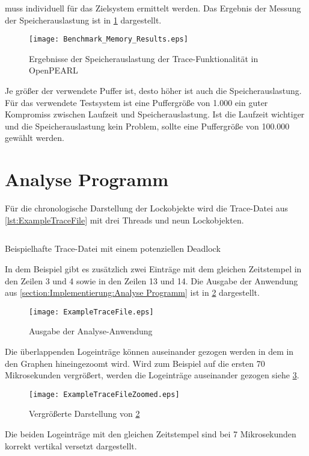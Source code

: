muss individuell für das Zielsystem ermittelt werden. Das Ergebnis der Messung
der Speicherauslastung ist in \cref{fig:BenchmarkMemoryResults} dargestellt.
\begin{figure}[ht]
  \texttt{[image: Benchmark\_Memory\_Results.eps]}
  \caption{Ergebnisse der Speicherauslastung der Trace-Funktionalität in OpenPEARL}
  \label{fig:BenchmarkMemoryResults}
\end{figure}
Je größer der verwendete Puffer ist, desto höher ist auch die
Speicherauslastung. Für das verwendete Testsystem ist eine Puffergröße von 1.000
ein guter Kompromiss zwischen Laufzeit und Speicherauslastung. Ist die Laufzeit
wichtiger und die Speicherauslastung kein Problem, sollte eine Puffergröße von
100.000 gewählt werden.

\section{Analyse Programm}
\label{section:ValidierungAnalyseProgramm}
Für die chronologische Darstellung der Lockobjekte wird die Trace-Datei aus
\cref{lst:ExampleTraceFile} mit drei Threads und neun Lockobjekten.
\begin{listing}[ht]
  \begin{minipage}[ht]{\linewidth}
    \begin{multicols}{3}
      \inputminted[linenos]{text}{./Examples/ExampleTraceFile.log}
    \end{multicols}
    \caption{Beispielhafte Trace-Datei mit einem potenziellen Deadlock}
    \label{lst:ExampleTraceFile}
  \end{minipage}
\end{listing}
In dem Beispiel gibt es zusätzlich zwei Einträge mit dem gleichen Zeitstempel in
den Zeilen 3 und 4 sowie in den Zeilen 13 und 14. Die Ausgabe der Anwendung aus
\cref{section:Implementierung:Analyse Programm} ist in
\cref{fig:LockTraceVisualization} dargestellt.
\begin{figure}[ht]
  \texttt{[image: ExampleTraceFile.eps]}
  \caption{Ausgabe der Analyse-Anwendung}
  \label{fig:LockTraceVisualization}
\end{figure}
Die überlappenden Logeinträge können auseinander gezogen werden in dem in den
Graphen hineingezoomt wird. Wird zum Beispiel auf die ersten 70 Mikrosekunden
vergrößert, werden die Logeinträge auseinander gezogen siehe
\cref{fig:LockTraceVisualizationZoomed}.
\begin{figure}[ht]
  \texttt{[image: ExampleTraceFileZoomed.eps]}
  \caption{Vergrößerte Darstellung von \cref{fig:LockTraceVisualization}}
  \label{fig:LockTraceVisualizationZoomed}
\end{figure}
Die beiden Logeinträge mit den gleichen Zeitstempel sind bei 7 Mikrosekunden
korrekt vertikal versetzt dargestellt.

